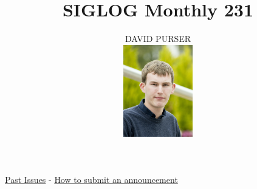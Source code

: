 \documentclass[prodmode,acmtecs]{acmsmall} %
\newcounter{colstart}
\begin{document}
\setcounter{colstart}{\thepage}

\title{\huge\sc SIGLOG Monthly 231}
\author{DAVID PURSER
\vspace*{-2.6cm}\begin{flushright}\includegraphics[width=30mm]{dp}\end{flushright}
}

\maketitlee

\href{https://lics.siglog.org/newsletters/}{Past Issues}
 - 
\href{https://lics.siglog.org/newsletters/inst.html}{How to submit an announcement}
\end{document}

